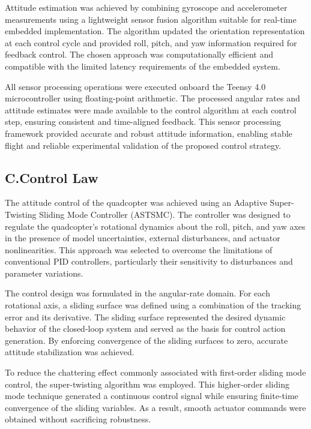 \begin{small}
\begin{enumerate}
Attitude estimation was achieved by combining gyroscope and accelerometer measurements using a lightweight sensor fusion algorithm suitable for real-time embedded implementation. The algorithm updated the orientation representation at each control cycle and provided roll, pitch, and yaw information required for feedback control. The chosen approach was computationally efficient and compatible with the limited latency requirements of the embedded system.

All sensor processing operations were executed onboard the Teensy 4.0 microcontroller using floating-point arithmetic. The processed angular rates and attitude estimates were made available to the control algorithm at each control step, ensuring consistent and time-aligned feedback. This sensor processing framework provided accurate and robust attitude information, enabling stable flight and reliable experimental validation of the proposed control strategy.

\subsection*{C.Control Law}

The attitude control of the quadcopter was achieved using an Adaptive Super-Twisting Sliding Mode Controller (ASTSMC). The controller was designed to regulate the quadcopter's rotational dynamics about the roll, pitch, and yaw axes in the presence of model uncertainties, external disturbances, and actuator nonlinearities. This approach was selected to overcome the limitations of conventional PID controllers, particularly their sensitivity to disturbances and parameter variations.

The control design was formulated in the angular-rate domain. For each rotational axis, a sliding surface was defined using a combination of the tracking error and its derivative. The sliding surface represented the desired dynamic behavior of the closed-loop system and served as the basis for control action generation. By enforcing convergence of the sliding surfaces to zero, accurate attitude stabilization was achieved.

To reduce the chattering effect commonly associated with first-order sliding mode control, the super-twisting algorithm was employed. This higher-order sliding mode technique generated a continuous control signal while ensuring finite-time convergence of the sliding variables. As a result, smooth actuator commands were obtained without sacrificing robustness.


\end{enumerate}
\end{small}
